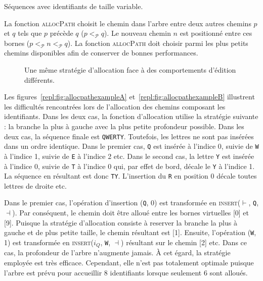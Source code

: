 \begin{algorithm}[h]
  
  \caption{\label{repl:algo:general}Séquences avec identifiants de taille
    variable.}
\end{algorithm}

La fonction \textsc{allocPath} choisit le chemin dans l'arbre entre deux autres
chemins $p$ et $q$ tels que $p$ précède $q$ ($p <_\mathcal{P} q$). Le nouveau
chemin $n$ est positionné entre ces bornes
($p <_\mathcal{P} n <_\mathcal{P} q$). La fonction \textsc{allocPath} doit
choisir parmi les plus petits chemins disponibles afin de conserver de bonnes
performances.

\begin{figure}
  \begin{center}
  \hspace{30pt}
  \end{center}
  \caption{Une même stratégie d'allocation face à des comportements d'édition
    différents.}
\end{figure}

Les figures~\ref{repl:fig:allocpathexampleA} et~\ref{repl:fig:allocpathexampleB}
illustrent les difficultés rencontrées lors de l'allocation des chemins
composant les identifiants. Dans les deux cas, la fonction d'allocation utilise
la stratégie suivante : la branche la plus à gauche avec la plus petite
profondeur possible. Dans les deux cas, la séquence finale est
\texttt{QWERTY}. Toutefois, les lettres ne sont pas insérées dans un ordre
identique. Dans le premier cas, \texttt{Q} est insérée à l'indice 0, suivie de
\texttt{W} à l'indice 1, suivie de \texttt{E} à l'indice 2 etc.  Dans le second
cas, la lettre \texttt{Y} est insérée à l'indice 0, suivie de \texttt{T} à
l'indice 0 qui, par effet de bord, décale le \texttt{Y} à l'indice 1. La
séquence en résultant est donc \texttt{TY}. L'insertion du \texttt{R} en
position 0 décale toutes lettres de droite etc.

Dans le premier cas, l'opération d'insertion (\texttt{Q}, 0) est transformée en
\textsc{insert}($\vdash$, \texttt{Q}, $\dashv$). Par conséquent, le chemin doit
être alloué entre les bornes virtuelles [0] et [9]. Puisque la stratégie
d'allocation consiste à reserver la branche la plus à gauche et de plus petite
taille, le chemin résultant est [1]. Ensuite, l'opération (\texttt{W}, 1) est
transformée en \textsc{insert}($i_Q$, \texttt{W}, $\dashv$) résultant sur le
chemin [2] etc.  Dans ce cas, la profondeur de l'arbre n'augmente jamais. À cet
égard, la stratégie employée est très efficace. Cependant, elle n'est pas
totalement optimale puisque l'arbre est prévu pour accueillir 8 identifiants
lorsque seulement 6 sont alloués.

